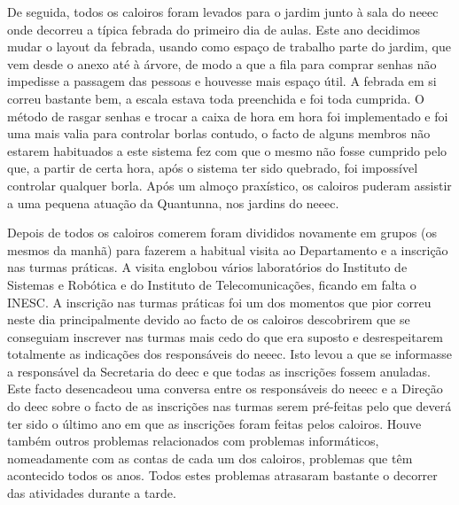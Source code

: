De seguida, todos os caloiros foram levados para o jardim junto à sala do \acrshort{neeec} onde decorreu a típica febrada do primeiro dia de aulas. Este ano decidimos mudar o layout da febrada, usando como espaço de trabalho parte do jardim, que vem desde o anexo até à árvore, de modo a que a fila para comprar senhas não impedisse a passagem das pessoas e houvesse mais espaço útil. A febrada em si correu bastante bem, a escala estava toda preenchida e foi toda cumprida. O método de rasgar senhas e trocar a caixa de hora em hora foi implementado e foi uma mais valia para controlar borlas contudo, o facto de alguns membros não estarem habituados a este sistema fez com que o mesmo não fosse cumprido pelo que, a partir de certa hora, após o sistema ter sido quebrado, foi impossível controlar qualquer borla. Após um almoço praxístico, os caloiros puderam assistir a uma pequena atuação da Quantunna, nos jardins do \acrshort{neeec}.

Depois de todos os caloiros comerem foram divididos novamente em grupos (os mesmos da manhã) para fazerem a habitual visita ao Departamento e a inscrição nas turmas práticas. A visita englobou vários laboratórios do Instituto de Sistemas e Robótica e do Instituto de Telecomunicações, ficando em falta o INESC. A inscrição nas turmas práticas foi um dos momentos que pior correu neste dia principalmente devido ao facto de os caloiros descobrirem que se conseguiam inscrever nas turmas mais cedo do que era suposto e desrespeitarem totalmente as indicações dos responsáveis do \acrshort{neeec}. Isto levou a que se informasse a responsável da Secretaria do \acrshort{deec} e que todas as inscrições fossem anuladas. Este facto desencadeou uma conversa entre os responsáveis do \acrshort{neeec} e a Direção do \acrshort{deec} sobre o facto de as inscrições nas turmas serem pré-feitas pelo que deverá ter sido o último ano em que as inscrições foram feitas pelos caloiros. Houve também outros problemas relacionados com problemas informáticos, nomeadamente com as contas de cada um dos caloiros, problemas que têm acontecido todos os anos. Todos estes problemas atrasaram bastante o decorrer das atividades durante a tarde.